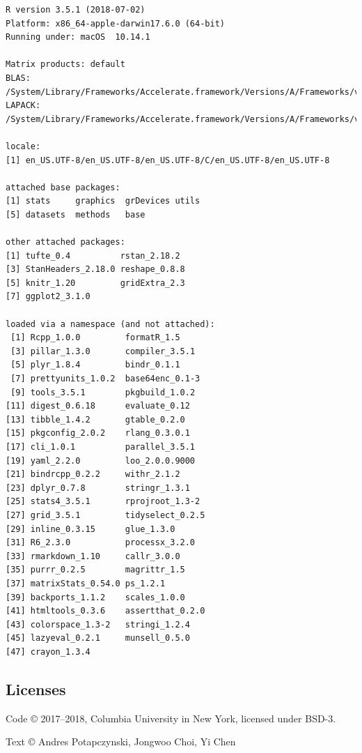 \documentclass[]{tufte-handout}
\begin{document}
\begin{verbatim}
R version 3.5.1 (2018-07-02)
Platform: x86_64-apple-darwin17.6.0 (64-bit)
Running under: macOS  10.14.1

Matrix products: default
BLAS: /System/Library/Frameworks/Accelerate.framework/Versions/A/Frameworks/vecLib.framework/Versions/A/libBLAS.dylib
LAPACK: /System/Library/Frameworks/Accelerate.framework/Versions/A/Frameworks/vecLib.framework/Versions/A/libLAPACK.dylib

locale:
[1] en_US.UTF-8/en_US.UTF-8/en_US.UTF-8/C/en_US.UTF-8/en_US.UTF-8

attached base packages:
[1] stats     graphics  grDevices utils    
[5] datasets  methods   base     

other attached packages:
[1] tufte_0.4          rstan_2.18.2      
[3] StanHeaders_2.18.0 reshape_0.8.8     
[5] knitr_1.20         gridExtra_2.3     
[7] ggplot2_3.1.0     

loaded via a namespace (and not attached):
 [1] Rcpp_1.0.0         formatR_1.5       
 [3] pillar_1.3.0       compiler_3.5.1    
 [5] plyr_1.8.4         bindr_0.1.1       
 [7] prettyunits_1.0.2  base64enc_0.1-3   
 [9] tools_3.5.1        pkgbuild_1.0.2    
[11] digest_0.6.18      evaluate_0.12     
[13] tibble_1.4.2       gtable_0.2.0      
[15] pkgconfig_2.0.2    rlang_0.3.0.1     
[17] cli_1.0.1          parallel_3.5.1    
[19] yaml_2.2.0         loo_2.0.0.9000    
[21] bindrcpp_0.2.2     withr_2.1.2       
[23] dplyr_0.7.8        stringr_1.3.1     
[25] stats4_3.5.1       rprojroot_1.3-2   
[27] grid_3.5.1         tidyselect_0.2.5  
[29] inline_0.3.15      glue_1.3.0        
[31] R6_2.3.0           processx_3.2.0    
[33] rmarkdown_1.10     callr_3.0.0       
[35] purrr_0.2.5        magrittr_1.5      
[37] matrixStats_0.54.0 ps_1.2.1          
[39] backports_1.1.2    scales_1.0.0      
[41] htmltools_0.3.6    assertthat_0.2.0  
[43] colorspace_1.3-2   stringi_1.2.4     
[45] lazyeval_0.2.1     munsell_0.5.0     
[47] crayon_1.3.4      
\end{verbatim}

\hypertarget{licenses}{%
\subsection*{Licenses}\label{licenses}}

{Code © 2017--2018, Columbia University in New York, licensed under
BSD-3.}

{Text © Andres Potapczynski, Jongwoo Choi, Yi Chen }
\end{document}
